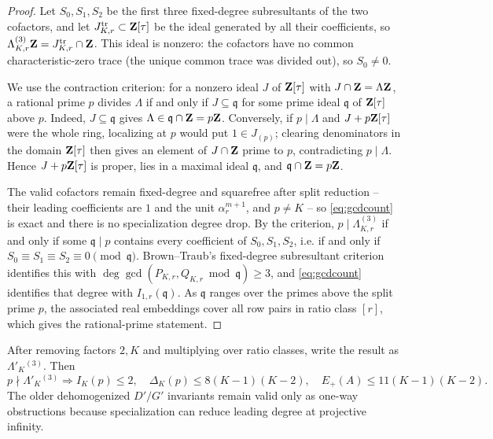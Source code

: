 \begin{proof}
Let $S_0,S_1,S_2$ be the first three fixed-degree subresultants of the two
cofactors, and let $J^{\mathrm{tr}}_{K,r}\subset\mathbf Z[\tau]$ be the ideal
generated by all their coefficients, so
$\Lambda_{K,r}^{(3)}\mathbf Z=J^{\mathrm{tr}}_{K,r}\cap\mathbf Z$.  This ideal is nonzero:
the cofactors have no common characteristic-zero trace (the unique common
trace was divided out), so $S_0\ne0$.

We use the contraction criterion: for a nonzero ideal $J$ of $\mathbf Z[\tau]$
with $J\cap\mathbf Z=\Lambda\mathbf Z$, a rational prime $p$ divides $\Lambda$ if and
only if $J\subseteq\mathfrak q$ for some prime ideal $\mathfrak q$ of
$\mathbf Z[\tau]$ above $p$.  Indeed, $J\subseteq\mathfrak q$ gives
$\Lambda\in\mathfrak q\cap\mathbf Z=p\mathbf Z$.  Conversely, if $p\mid\Lambda$ and
$J+p\mathbf Z[\tau]$ were the whole ring, localizing at $p$ would put
$1\in J_{(p)}$; clearing denominators in the domain $\mathbf Z[\tau]$ then gives
an element of $J\cap\mathbf Z$ prime to $p$, contradicting $p\mid\Lambda$.
Hence $J+p\mathbf Z[\tau]$ is proper, lies in a maximal ideal $\mathfrak q$, and
$\mathfrak q\cap\mathbf Z=p\mathbf Z$.

The valid cofactors remain fixed-degree and squarefree after split
reduction -- their leading coefficients are $1$ and the unit
$\alpha_r^{m+1}$, and $p\ne K$ -- so \eqref{eq:gcdcount} is exact and
there is no specialization degree drop.  By the criterion,
$p\mid\Lambda_{K,r}^{(3)}$ if and only if some $\mathfrak q\mid p$
contains every coefficient of $S_0,S_1,S_2$, i.e. if and only if
$S_0\equiv S_1\equiv S_2\equiv0\pmod{\mathfrak q}$.  Brown--Traub's
fixed-degree subresultant criterion \cite{BT1971} identifies this with
$\deg\gcd(P_{K,r},Q_{K,r}\bmod\mathfrak q)\ge3$, and \eqref{eq:gcdcount}
identifies that degree with $I_{1,r}(\mathfrak q)$.  As $\mathfrak q$
ranges over the primes above the split prime $p$, the associated real
embeddings cover all row pairs in ratio class $[r]$, which gives the
rational-prime statement.
\end{proof}

After removing factors $2,K$ and multiplying over ratio classes, write the
result as $\Lambda'_K{}^{(3)}$.  Then
\begin{equation}\label{eq:outside-support}
p\nmid\Lambda'_K{}^{(3)}
\Longrightarrow
I_K(p)\le2,
\quad
\Delta_K(p)\le8(K-1)(K-2),
\quad
E_+(A)\le11(K-1)(K-2).
\end{equation}
The older dehomogenized $D'/G'$ invariants remain valid only as one-way
obstructions because specialization can reduce leading degree at projective
infinity.

